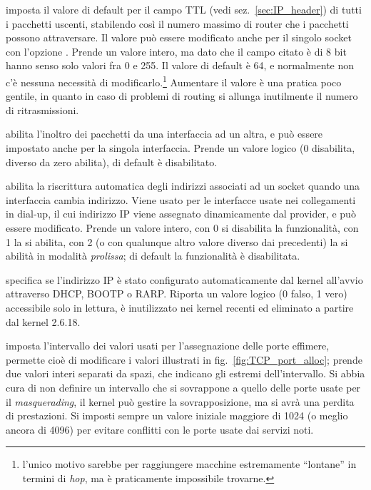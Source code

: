 \begin{basedescript}{\desclabelwidth{2.2cm}\desclabelstyle{\nextlinelabel}}

\item[\sysctlrelfiled{net/ipv4}{ip\_default\_ttl}] imposta il valore di
  default per il campo TTL (vedi sez.~\ref{sec:IP_header}) di tutti i
  pacchetti uscenti, stabilendo così il numero massimo di router che i
  pacchetti possono attraversare. Il valore può essere modificato anche per il
  singolo socket con l'opzione .  Prende un valore intero, ma
  dato che il campo citato è di 8 bit hanno senso solo valori fra 0 e 255. Il
  valore di default è 64, e normalmente non c'è nessuna necessità di
  modificarlo.\footnote{l'unico motivo sarebbe per raggiungere macchine
    estremamente ``{lontane}'' in termini di \textit{hop}, ma è praticamente
    impossibile trovarne.} Aumentare il valore è una pratica poco gentile, in
  quanto in caso di problemi di routing si allunga inutilmente il numero di
  ritrasmissioni.

\item[\sysctlrelfiled{net/ipv4}{ip\_forward}] abilita l'inoltro dei
  pacchetti da una interfaccia ad un altra, e può essere impostato anche per
  la singola interfaccia. Prende un valore logico (0 disabilita, diverso da
  zero abilita), di default è disabilitato.

\item[\sysctlrelfiled{net/ipv4}{ip\_dynaddr}] abilita la riscrittura
  automatica degli indirizzi associati ad un socket quando una interfaccia
  cambia indirizzo. Viene usato per le interfacce usate nei collegamenti in
  dial-up, il cui indirizzo IP viene assegnato dinamicamente dal provider, e
  può essere modificato. Prende un valore intero, con 0 si disabilita la
  funzionalità, con 1 la si abilita, con 2 (o con qualunque altro valore
  diverso dai precedenti) la si abilità in modalità \textsl{prolissa}; di
  default la funzionalità è disabilitata.

\item[\sysctlrelfiled{net/ipv4}{ip\_autoconfig}] specifica se
  l'indirizzo IP è stato configurato automaticamente dal kernel all'avvio
  attraverso DHCP, BOOTP o RARP. Riporta un valore logico (0 falso, 1 vero)
  accessibile solo in lettura, è inutilizzato nei kernel recenti ed eliminato
  a partire dal kernel 2.6.18.

\item[\sysctlrelfiled{net/ipv4}{ip\_local\_port\_range}] imposta l'intervallo
  dei valori usati per l'assegnazione delle porte effimere, permette cioè di
  modificare i valori illustrati in fig.~\ref{fig:TCP_port_alloc}; prende due
  valori interi separati da spazi, che indicano gli estremi
  dell'intervallo. Si abbia cura di non definire un intervallo che si
  sovrappone a quello delle porte usate per il \textit{masquerading}, il
  kernel può gestire la sovrapposizione, ma si avrà una perdita di
  prestazioni. Si imposti sempre un valore iniziale maggiore di 1024 (o meglio
  ancora di 4096) per evitare conflitti con le porte usate dai servizi noti.


\end{basedescript}
